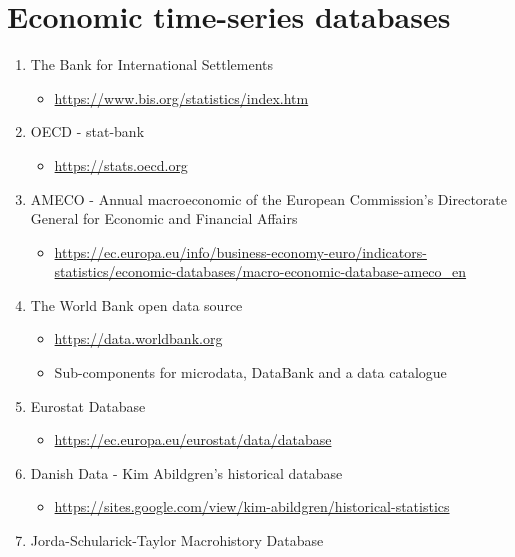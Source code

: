 \documentclass[
]{book}
\providecommand{\tightlist}{%
  \setlength{\itemsep}{0pt}\setlength{\parskip}{0pt}}
\begin{document}
\hypertarget{economic-time-series-databases}{%
\section{Economic time-series databases}\label{economic-time-series-databases}}

\begin{enumerate}
\def\labelenumi{\arabic{enumi}.}
\tightlist
\item
  The Bank for International Settlements

  \begin{itemize}
  \tightlist
  \item
    \url{https://www.bis.org/statistics/index.htm}
  \end{itemize}
\item
  OECD - stat-bank

  \begin{itemize}
  \tightlist
  \item
    \url{https://stats.oecd.org}
  \end{itemize}
\item
  AMECO - Annual macroeconomic of the European Commission's Directorate General for Economic and Financial Affairs

  \begin{itemize}
  \tightlist
  \item
    \url{https://ec.europa.eu/info/business-economy-euro/indicators-statistics/economic-databases/macro-economic-database-ameco_en}
  \end{itemize}
\item
  The World Bank open data source

  \begin{itemize}
  \tightlist
  \item
    \url{https://data.worldbank.org}
  \item
    Sub-components for microdata, DataBank and a data catalogue
  \end{itemize}
\item
  Eurostat Database

  \begin{itemize}
  \tightlist
  \item
    \url{https://ec.europa.eu/eurostat/data/database}
  \end{itemize}
\item
  Danish Data - Kim Abildgren's historical database

  \begin{itemize}
  \tightlist
  \item
    \url{https://sites.google.com/view/kim-abildgren/historical-statistics}
  \end{itemize}
\item
  Jorda-Schularick-Taylor Macrohistory Database


\end{enumerate}
\end{document}
